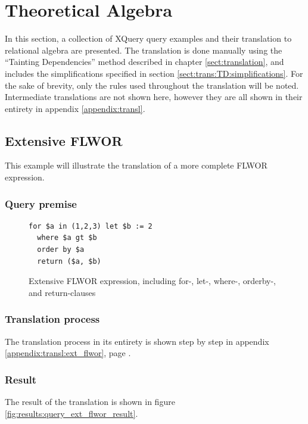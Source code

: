 \section{Theoretical Algebra}
\label{sect:result:theoretical_algebra}
In this section, a collection of XQuery query examples and their translation to
relational algebra are presented. The translation is done manually using the
``Tainting Dependencies'' method described in chapter \ref{sect:translation},
and includes the simplifications specified in section
\ref{sect:trans:TD:simplifications}. For the sake of brevity, only the rules
used throughout the translation will be noted. Intermediate translations are
not shown here, however they are all shown in their entirety in appendix
\ref{appendix:transl}.

\subsection{Extensive FLWOR}
This example will illustrate the translation of a more complete FLWOR
expression.

\subsubsection{Query premise}
\begin{figure}[!htp]
\begin{center}
\begin{Verbatim}
for $a in (1,2,3) let $b := 2
  where $a gt $b
  order by $a
  return ($a, $b)
\end{Verbatim}
  \caption{Extensive FLWOR expression, including for-, let-, where-, orderby-,
  and return-clauses}
  \label{fig:results:query_ext_flwor}
\end{center}
\end{figure}

\subsubsection{Translation process}
The translation process in its entirety is shown step by step in appendix
\ref{appendix:transl:ext_flwor}, page \pageref{appendix:transl:ext_flwor}.

\subsubsection{Result}
The result of the translation is shown in figure
\ref{fig:results:query_ext_flwor_result}.

